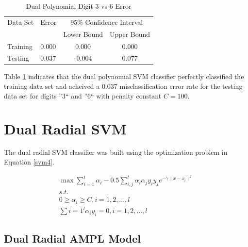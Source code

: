 \documentclass{article}
\begin{document}
\begin{table}\label{table3}
\caption{Dual Polynomial Digit 3 vs 6 Error}
\begin{center}
\begin{tabular}{llcc}
\toprule
Data Set & Error & \multicolumn{2}{c}{95\% Confidence Interval} \\
\cmidrule(r){3-4}
& & Lower Bound & Upper Bound \\
\midrule
Training & 0.000 & 0.000 & 0.000 \\
Testing & 0.037 & -0.004 & 0.077 \\
\bottomrule
\end{tabular}
\end{center}
\end{table}

Table \ref{table3} indicates that the dual polynomial SVM classifier perfectly classified the training data set and acheived a \(0.037\) misclassification error rate for the testing data set for digits ''3`` and ''6`` with penalty constant \(C=100\).

\section{Dual Radial SVM}\label{model4}

The dual radial SVM classifier was built using the optimization problem in Equation \ref{svm4}.

\begin{equation}\label{svm4}
\begin{split}
\max \sum_{i=1}^l \alpha_i - 0.5 \sum_{i,j}^l \alpha_i \alpha_j y_i y_j e^{-\gamma \| x - x_i \|^2 } \\
s.t. \\
0 \ge \alpha_i \ge C , i = 1,2,...,l \\
\sum{i=1}^l \alpha_i y_i = 0 , i = 1,2,...,l
\end{split}
\end{equation}

\subsection{Dual Radial AMPL Model}
\end{document}
